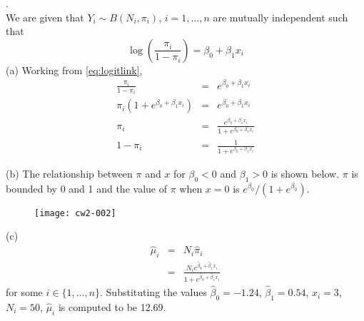 \documentclass[a4paper,11pt]{article}
\begin{document}
.\\
We are given that $Y_i \sim B(N_i,\pi_i)$, $i=1,\dots,n$ are mutually independent such that
\begin{equation}\label{eq:logitlink}
\log \left(\frac{\pi_i}{1-\pi_i}\right) = \beta_0 + \beta_1 x_i
\end{equation}
(a) Working from \eqref{eq:logitlink},
\begin{eqnarray*}
\frac{\pi_i}{1-\pi_i} & = & e^{\beta_0 + \beta_1 x_i}\\
\pi_i\left(1+e^{\beta_0 + \beta_1 x_i}\right) & = & e^{\beta_0 + \beta_1 x_i}\\
\pi_i & = & \frac{e^{\beta_0 + \beta_1 x_i}}{1+e^{\beta_0 + \beta_1 x_i}}\\
1-\pi_i & = & \frac{1}{1+e^{\beta_0 + \beta_1 x_i}}
\end{eqnarray*}

(b) The relationship between $\pi$ and $x$ for $\beta_0<0$ and $\beta_1>0$ is shown below. $\pi$ is bounded by 0 and 1 and the value of $\pi$ when $x=0$ is $e^{\beta_0}/(1+e^{\beta_0})$.
\begin{figure}[h]
\begin{center}
\texttt{[image: cw2-002]}
\end{center}
\end{figure}

(c)
\begin{eqnarray*}
\hat\mu_i & = & N_i\hat\pi_i\\
					& = & \frac{N_ie^{\hat\beta_0 + \hat\beta_1 x_i}}{1+e^{\hat\beta_0 + \hat\beta_1 x_i}}
\end{eqnarray*}
for some $i \in \{1,\dots,n\}$. Substituting the values $\hat\beta_0=-1.24$, $\hat\beta_1=0.54$, $x_i=3$, $N_i=50$, $\hat\mu_i$ is computed to be
12.69.
\end{document}
